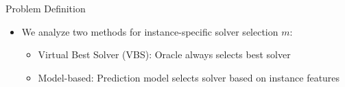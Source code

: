 \documentclass[en]{sdqbeamer}
\begin{document}
\begin{frame}[t]{Problem Definition}
\begin{definition}
	\end{definition}
	\pause
	\begin{itemize}
		\item We analyze two methods for instance-specific solver selection $m$:
		\begin{itemize}
			\item Virtual Best Solver (VBS): Oracle always selects best solver
			\pause
			\item Model-based: Prediction model selects solver based on instance features
		\end{itemize}
	\end{itemize}
\end{frame}
\end{document}
